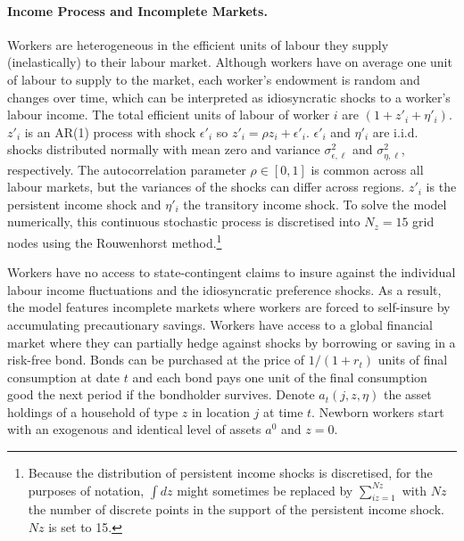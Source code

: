 \documentclass[12pt, a4paper]{article}
\begin{document}
\paragraph{Income Process and Incomplete Markets.} Workers are heterogeneous in the efficient units of labour they supply (inelastically) to their labour market. Although workers have on average one unit of labour to supply to the market, each worker’s endowment is random and changes over time, which can be interpreted as idiosyncratic shocks to a worker's labour income. The total efficient units of labour of worker $i$ are $(1 + z'_i + \eta'_i)$. $z'_i$ is an AR(1) process with shock $\epsilon'_i$ so $z'_i = \rho z_i + \epsilon'_i$. $\epsilon'_i$ and $\eta'_i$ are i.i.d. shocks distributed normally with mean zero and variance $\sigma^2_{\epsilon, \ell}$ and $\sigma^2_{\eta, \ell}$, respectively. The autocorrelation parameter $\rho \in [0,1]$ is common across all labour markets, but the variances of the shocks can differ across regions. $z'_i$ is the persistent income shock and $\eta'_i$ the transitory income shock. To solve the model numerically, this continuous stochastic process is discretised into $N_z = 15$ grid nodes using the Rouwenhorst method.\footnote{Because the distribution of persistent income shocks is discretised, for the purposes of notation, $\int dz$ might sometimes be replaced by $\sum_{iz = 1}^{Nz}$ with $Nz$ the number of discrete points in the support of the persistent income shock. $Nz$ is set to 15.}

Workers have no access to state-contingent claims to insure against the individual labour income fluctuations and the idiosyncratic preference shocks. As a result, the model features incomplete markets where workers are forced to self-insure by accumulating precautionary savings. Workers have access to a global financial market where they can partially hedge against shocks by borrowing or saving in a risk-free bond. Bonds can be purchased at the price of $1/(1 + r_t)$ units of final consumption at date $t$ and each bond pays one unit of the final consumption good the next period if the bondholder survives. Denote $a_t(j,z, \eta)$ the asset holdings of a household of type $z$ in location $j$ at time $t$. Newborn workers start with an exogenous and identical level of assets $a^0$ and $z = 0$.
\end{document}
